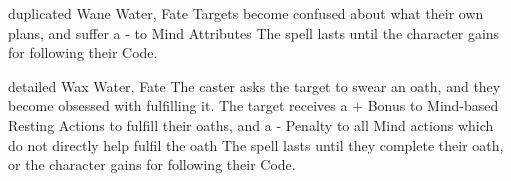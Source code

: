 \ifodd\value{diceNo}

  {duplicated}%
  {Wane}%
  {Water, Fate}%
  {}%
  {Targets become confused about what their own plans, and suffer a - to Mind Attributes}%
  {The spell lasts until the character gains  for following their Code.}

\else

  {detailed}%
  {Wax}%
  {Water, Fate}%
  {}%
  {The caster asks the target to swear an oath, and they become obsessed with fulfilling it.
  The target receives a + Bonus to Mind-based Resting Actions to fulfill their oaths, and a - Penalty to all Mind actions which do not directly help fulfil the oath}%
  {The spell lasts until they complete their oath, or the character gains  for following their Code.}

\fi
{}
